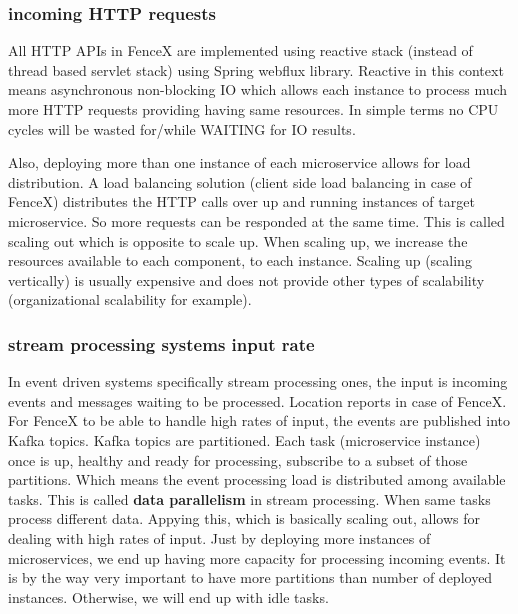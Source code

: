 \documentclass[a4]{report}
\begin{document}
    \subsubsection{incoming HTTP requests}
    All HTTP APIs in FenceX are implemented using reactive stack (instead of thread based servlet stack) using Spring
    webflux library.
    Reactive in this context means asynchronous non-blocking IO which allows each instance to process much more HTTP
    requests providing having same resources.
    In simple terms no CPU cycles will be wasted for/while WAITING for IO results.

    Also, deploying more than one instance of each microservice allows for load distribution.
    A load balancing solution (client side load balancing in case of FenceX) distributes the HTTP calls over up and
    running instances of target microservice.
    So more requests can be responded at the same time.
    This is called scaling out which is opposite to scale up.
    When scaling up, we increase the resources available to each component, to each instance.
    Scaling up (scaling vertically) is usually expensive and does not provide other types of scalability
    (organizational scalability for example).

    \subsubsection{stream processing systems input rate}
    In event driven systems specifically stream processing ones, the input is incoming events and messages waiting to
    be processed.
    Location reports in case of FenceX.
    For FenceX to be able to handle high rates of input, the events are published into Kafka topics.
    Kafka topics are partitioned.
    Each task (microservice instance) once is up, healthy and ready for processing, subscribe to a subset of those
    partitions.
    Which means the event processing load is distributed among available tasks.
    This is called \textbf{data parallelism} in stream processing.
    When same tasks process different data.
    Appying this, which is basically scaling out, allows for dealing with high rates of input.
    Just by deploying more instances of microservices, we end up having more capacity for processing incoming events.
    It is by the way very important to have more partitions than number of deployed instances.
    Otherwise, we will end up with idle tasks.
\end{document}
